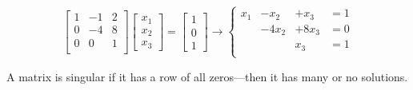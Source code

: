 \documentclass[10pt]{extarticle}
\begin{document}
\begin{multicols*}{2}
\begin{equation*}
	\begin{bmatrix}
		1 & -1 & 2 \\
		0 & -4 & 8 \\
		0 & 0 & 1 \\
	\end{bmatrix}
	\begin{bmatrix}
		x_1 \\ x_2 \\ x_3
	\end{bmatrix}
	=
	\begin{bmatrix}
		1 \\ 0 \\ 1
	\end{bmatrix}
	\rightarrow
	\left\{\begin{aligned}
		x_1 &- x_2 	&+ x_3 	&= 1 \\
				&- 4x_2 &+ 8x_3 &= 0 \\
				& 			& x_3 	&= 1 \\ 
	\end{aligned}\right.
\end{equation*}

A matrix is singular if it has a row of all zeros---then it has many or no solutions. 



\end{multicols*}
\end{document}
